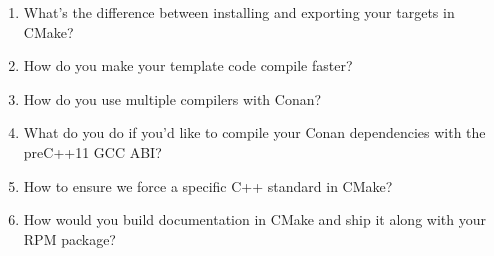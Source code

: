 \begin{enumerate}
\item
What's the difference between installing and exporting your targets in CMake?

\item
How do you make your template code compile faster?

\item
How do you use multiple compilers with Conan?

\item
What do you do if you'd like to compile your Conan dependencies with the preC++11 GCC ABI?

\item
How to ensure we force a specific C++ standard in CMake?

\item
How would you build documentation in CMake and ship it along with your RPM package?
\end{enumerate}